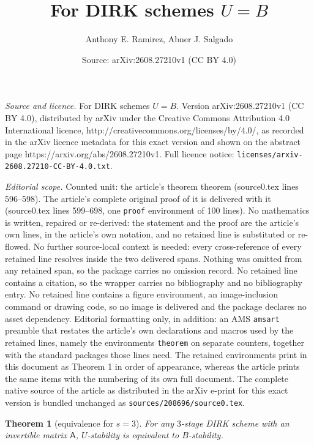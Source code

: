 \documentclass[10pt,a4paper]{amsart}
\title{For DIRK schemes $U=B$}
\author{Anthony E. Ramirez, Abner J. Salgado}
\date{Source: arXiv:2608.27210v1 (CC BY 4.0)}
\newtheorem{theorem}{Theorem}
\newcommand{\AJS}[1]{#1}
\newcommand{\msfA}{\mathsf{A}}
\begin{document}
\maketitle

\noindent\emph{Source and licence.} For DIRK schemes $U=B$. Version arXiv:2608.27210v1 (CC BY 4.0), distributed by arXiv under the Creative Commons Attribution 4.0 International licence, http://creativecommons.org/licenses/by/4.0/, as recorded in the arXiv licence metadata for this exact version and shown on the abstract page https://arxiv.org/abs/2608.27210v1. Full licence notice: \texttt{licenses/arxiv-2608.27210-CC-BY-4.0.txt}.\par\smallskip

\noindent\textit{Editorial scope.} Counted unit: the article's theorem theorem (source0.tex lines 596--598). The article's complete original proof of it is delivered with it (source0.tex lines 599--698, one \texttt{proof} environment of 100 lines). No mathematics is written, repaired or re-derived: the statement and the proof are the article's own lines, in the article's own notation, and no retained line is substituted or re-flowed.  No further source-local context is needed: every cross-reference of every retained line resolves inside the two delivered spans.  Nothing was omitted from any retained span, so the package carries no omission record.  No retained line contains a citation, so the wrapper carries no bibliography and no bibliography entry.  No retained line contains a figure environment, an image-inclusion command or drawing code, so no image is delivered and the package declares no asset dependency.  Editorial formatting only, in addition: an AMS \texttt{amsart} preamble that restates the article's own declarations and macros used by the retained lines, namely the environments \texttt{theorem} on separate counters, together with the standard packages those lines need.  The retained environments print in this document as Theorem 1 in order of appearance, whereas the article prints the same items with the numbering of its own full document.  The complete native source of the article as distributed in the arXiv e-print for this exact version is bundled unchanged as \texttt{sources/208696/source0.tex}.
\begin{theorem}[equivalence \AJS{for $s=3$}]
  For any $3$-stage DIRK scheme with an invertible matrix $\msfA$, $U$-stability is equivalent to $B$-stability.
\end{theorem}
\end{document}
